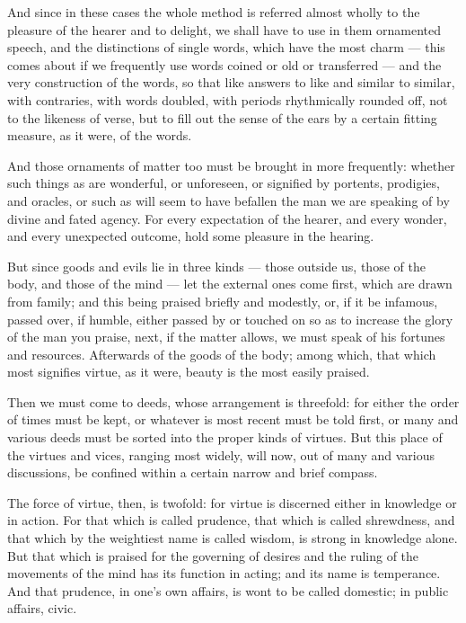  And since in these cases the whole method is referred almost wholly to the pleasure of the hearer and to delight, we shall have to use in them ornamented speech, and the distinctions of single words, which have the most charm — this comes about if we frequently use words coined or old or transferred — and the very construction of the words, so that like answers to like and similar to similar, with contraries, with words doubled, with periods rhythmically rounded off, not to the likeness of verse, but to fill out the sense of the ears by a certain fitting measure, as it were, of the words.

 And those ornaments of matter too must be brought in more frequently: whether such things as are wonderful, or unforeseen, or signified by portents, prodigies, and oracles, or such as will seem to have befallen the man we are speaking of by divine and fated agency. For every expectation of the hearer, and every wonder, and every unexpected outcome, hold some pleasure in the hearing.

 But since goods and evils lie in three kinds — those outside us, those of the body, and those of the mind — let the external ones come first, which are drawn from family; and this being praised briefly and modestly, or, if it be infamous, passed over, if humble, either passed by or touched on so as to increase the glory of the man you praise, next, if the matter allows, we must speak of his fortunes and resources. Afterwards of the goods of the body; among which, that which most signifies virtue, as it were, beauty is the most easily praised.

 Then we must come to deeds, whose arrangement is threefold: for either the order of times must be kept, or whatever is most recent must be told first, or many and various deeds must be sorted into the proper kinds of virtues. But this place of the virtues and vices, ranging most widely, will now, out of many and various discussions, be confined within a certain narrow and brief compass.

 The force of virtue, then, is twofold: for virtue is discerned either in knowledge or in action. For that which is called prudence, that which is called shrewdness, and that which by the weightiest name is called wisdom, is strong in knowledge alone. But that which is praised for the governing of desires and the ruling of the movements of the mind has its function in acting; and its name is temperance. And that prudence, in one's own affairs, is wont to be called domestic; in public affairs, civic.

